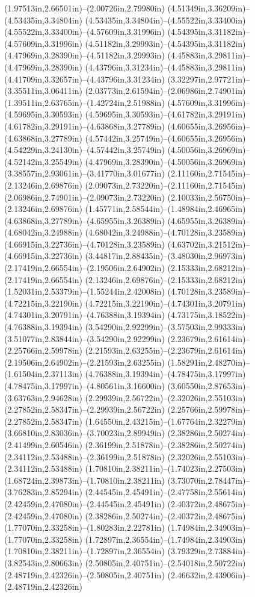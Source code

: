 (1.97513in,2.66501in)--(2.00726in,2.79980in) (4.51349in,3.36209in)--(4.53435in,3.34804in) (4.53435in,3.34804in)--(4.55522in,3.33400in) (4.55522in,3.33400in)--(4.57609in,3.31996in) (4.54395in,3.31182in)--(4.57609in,3.31996in) (4.51182in,3.29993in)--(4.54395in,3.31182in) (4.47969in,3.28390in)--(4.51182in,3.29993in) (4.45883in,3.29811in)--(4.47969in,3.28390in) (4.43796in,3.31234in)--(4.45883in,3.29811in) (4.41709in,3.32657in)--(4.43796in,3.31234in) (3.32297in,2.97721in)--(3.35511in,3.06411in) (2.03773in,2.61594in)--(2.06986in,2.74901in) (1.39511in,2.63765in)--(1.42724in,2.51988in) (4.57609in,3.31996in)--(4.59695in,3.30593in) (4.59695in,3.30593in)--(4.61782in,3.29191in) (4.61782in,3.29191in)--(4.63868in,3.27789in) (4.60655in,3.26956in)--(4.63868in,3.27789in) (4.57442in,3.25749in)--(4.60655in,3.26956in) (4.54229in,3.24130in)--(4.57442in,3.25749in) (4.50056in,3.26969in)--(4.52142in,3.25549in) (4.47969in,3.28390in)--(4.50056in,3.26969in) (3.38557in,2.93061in)--(3.41770in,3.01677in) (2.11160in,2.71545in)--(2.13246in,2.69876in) (2.09073in,2.73220in)--(2.11160in,2.71545in) (2.06986in,2.74901in)--(2.09073in,2.73220in) (2.10033in,2.56750in)--(2.13246in,2.69876in) (1.45771in,2.58544in)--(1.48984in,2.46965in) (4.63868in,3.27789in)--(4.65955in,3.26389in) (4.65955in,3.26389in)--(4.68042in,3.24988in) (4.68042in,3.24988in)--(4.70128in,3.23589in) (4.66915in,3.22736in)--(4.70128in,3.23589in) (4.63702in,3.21512in)--(4.66915in,3.22736in) (3.44817in,2.88435in)--(3.48030in,2.96973in) (2.17419in,2.66554in)--(2.19506in,2.64902in) (2.15333in,2.68212in)--(2.17419in,2.66554in) (2.13246in,2.69876in)--(2.15333in,2.68212in) (1.52031in,2.53379in)--(1.55244in,2.42008in) (4.70128in,3.23589in)--(4.72215in,3.22190in) (4.72215in,3.22190in)--(4.74301in,3.20791in) (4.74301in,3.20791in)--(4.76388in,3.19394in) (4.73175in,3.18522in)--(4.76388in,3.19394in) (3.54290in,2.92299in)--(3.57503in,2.99333in) (3.51077in,2.83844in)--(3.54290in,2.92299in) (2.23679in,2.61614in)--(2.25766in,2.59978in) (2.21593in,2.63255in)--(2.23679in,2.61614in) (2.19506in,2.64902in)--(2.21593in,2.63255in) (1.58291in,2.48270in)--(1.61504in,2.37113in) (4.76388in,3.19394in)--(4.78475in,3.17997in) (4.78475in,3.17997in)--(4.80561in,3.16600in) (3.60550in,2.87653in)--(3.63763in,2.94628in) (2.29939in,2.56722in)--(2.32026in,2.55103in) (2.27852in,2.58347in)--(2.29939in,2.56722in) (2.25766in,2.59978in)--(2.27852in,2.58347in) (1.64550in,2.43215in)--(1.67764in,2.32279in) (3.66810in,2.83036in)--(3.70023in,2.89949in) (2.38286in,2.50274in)--(2.41499in,2.60546in) (2.36199in,2.51878in)--(2.38286in,2.50274in) (2.34112in,2.53488in)--(2.36199in,2.51878in) (2.32026in,2.55103in)--(2.34112in,2.53488in) (1.70810in,2.38211in)--(1.74023in,2.27503in) (1.68724in,2.39873in)--(1.70810in,2.38211in) (3.73070in,2.78447in)--(3.76283in,2.85294in) (2.44545in,2.45491in)--(2.47758in,2.55614in) (2.42459in,2.47080in)--(2.44545in,2.45491in) (2.40372in,2.48675in)--(2.42459in,2.47080in) (2.38286in,2.50274in)--(2.40372in,2.48675in) (1.77070in,2.33258in)--(1.80283in,2.22781in) (1.74984in,2.34903in)--(1.77070in,2.33258in) (1.72897in,2.36554in)--(1.74984in,2.34903in) (1.70810in,2.38211in)--(1.72897in,2.36554in) (3.79329in,2.73884in)--(3.82543in,2.80663in) (2.50805in,2.40751in)--(2.54018in,2.50722in) (2.48719in,2.42326in)--(2.50805in,2.40751in) (2.46632in,2.43906in)--(2.48719in,2.42326in) 